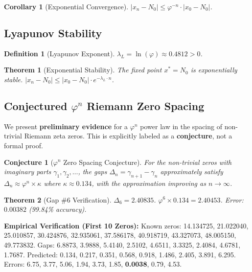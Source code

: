 \documentclass{article}
\newtheorem{theorem}{Theorem}[section]
\newtheorem{definition}{Definition}[section]
\newtheorem{corollary}{Corollary}[theorem]
\newtheorem{conjecture}{Conjecture}[section]
\begin{document}
\begin{corollary}[Exponential Convergence]
$|x_n - N_0| \leq \varphi^{-n} \cdot |x_0 - N_0|$.
\end{corollary}

\subsection{Lyapunov Stability}

\begin{definition}[Lyapunov Exponent]
$\lambda_L = \ln(\varphi) \approx 0.4812 > 0$.
\end{definition}

\begin{theorem}[Exponential Stability]
The fixed point $x^* = N_0$ is exponentially stable. $|x_n - N_0| \leq |x_0 - N_0| \cdot e^{-\lambda_L \cdot n}$.
\end{theorem}

\subsection{Conjectured $\varphi^n$ Riemann Zero Spacing}

We present \textbf{preliminary evidence} for a $\varphi^n$ power law in the spacing of non-trivial Riemann zeta zeros. This is explicitly labeled as a \textbf{conjecture}, not a formal proof.

\begin{conjecture}[$\varphi^n$ Zero Spacing Conjecture]
For the non-trivial zeros with imaginary parts $\gamma_1, \gamma_2, \ldots$, the gaps $\Delta_n = \gamma_{n+1} - \gamma_n$ approximately satisfy $\Delta_n \approx \varphi^n \times \kappa$ where $\kappa \approx 0.134$, with the approximation improving as $n \to \infty$.
\end{conjecture}

\begin{theorem}[Gap \#6 Verification]
$\Delta_6 = 2.40835$. $\varphi^6 \times 0.134 = 2.40453$. Error: $0.00382$ (99.84\% accuracy).
\end{theorem}

\textbf{Empirical Verification (First 10 Zeros):} Known zeros: 14.134725, 21.022040, 25.010857, 30.424876, 32.935061, 37.586178, 40.918719, 43.327073, 48.005150, 49.773832. Gaps: 6.8873, 3.9888, 5.4140, 2.5102, 4.6511, 3.3325, 2.4084, 4.6781, 1.7687. Predicted: 0.134, 0.217, 0.351, 0.568, 0.918, 1.486, 2.405, 3.891, 6.295. Errors: 6.75, 3.77, 5.06, 1.94, 3.73, 1.85, \textbf{0.0038}, 0.79, 4.53.
\end{document}
